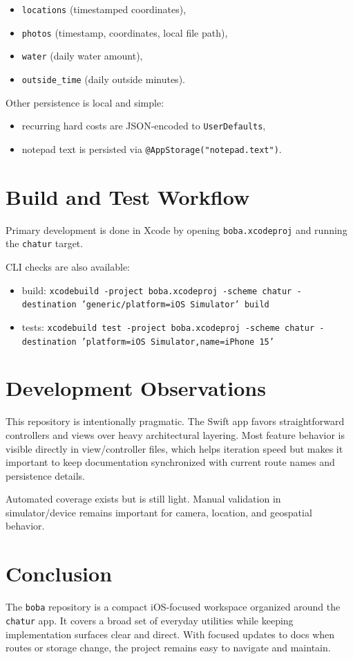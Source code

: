 \documentclass[11pt]{article}
\begin{document}
\begin{itemize}[leftmargin=*]
\item \texttt{locations} (timestamped coordinates),
\item \texttt{photos} (timestamp, coordinates, local file path),
\item \texttt{water} (daily water amount),
\item \texttt{outside\_time} (daily outside minutes).
\end{itemize}

Other persistence is local and simple:

\begin{itemize}[leftmargin=*]
\item recurring hard costs are JSON-encoded to \texttt{UserDefaults},
\item notepad text is persisted via \texttt{@AppStorage("notepad.text")}. 
\end{itemize}

\section{Build and Test Workflow}
Primary development is done in Xcode by opening \texttt{boba.xcodeproj} and running the \texttt{chatur} target.

CLI checks are also available:

\begin{itemize}[leftmargin=*]
\item build: \texttt{xcodebuild -project boba.xcodeproj -scheme chatur -destination 'generic/platform=iOS Simulator' build}
\item tests: \texttt{xcodebuild test -project boba.xcodeproj -scheme chatur -destination 'platform=iOS Simulator,name=iPhone 15'}
\end{itemize}

\section{Development Observations}
This repository is intentionally pragmatic. The Swift app favors straightforward controllers and views over heavy architectural layering. Most feature behavior is visible directly in view/controller files, which helps iteration speed but makes it important to keep documentation synchronized with current route names and persistence details.

Automated coverage exists but is still light. Manual validation in simulator/device remains important for camera, location, and geospatial behavior.

\section{Conclusion}
The \texttt{boba} repository is a compact iOS-focused workspace organized around the \texttt{chatur} app. It covers a broad set of everyday utilities while keeping implementation surfaces clear and direct. With focused updates to docs when routes or storage change, the project remains easy to navigate and maintain.
\end{document}
